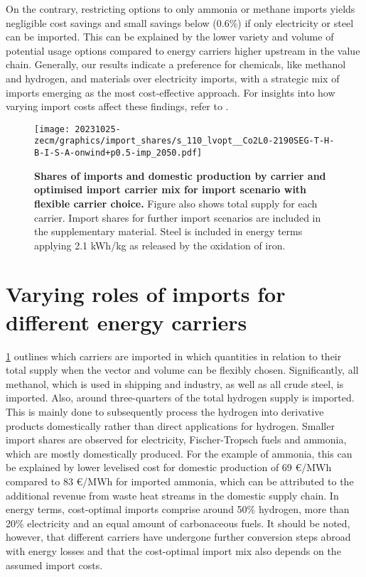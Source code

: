On the contrary, restricting options to only ammonia or methane imports yields
negligible cost savings and small savings below  (0.6\%) if only
electricity or steel can be imported. This can be explained by the lower variety
and volume of potential usage options compared to energy carriers higher
upstream in the value chain. Generally, our results indicate a preference for
chemicals, like methanol and hydrogen, and materials over electricity imports,
with a strategic mix of imports emerging as the most cost-effective approach.
For insights into how varying import costs affect these findings, refer to
. 

\begin{figure}[!htb]
    \texttt{[image: 20231025-zecm/graphics/import\_shares/s\_110\_lvopt\_\_Co2L0-2190SEG-T-H-B-I-S-A-onwind+p0.5-imp\_2050.pdf]}
    \caption{\textbf{Shares of imports and domestic production by carrier and optimised import carrier mix for import scenario with flexible carrier choice.} 
        Figure also shows total supply for each carrier.
        Import shares for further import scenarios are included in the supplementary material.
        Steel is included in energy terms applying 2.1 kWh/kg as released by the oxidation of iron.
    }
    \label{fig:import-shares}
\end{figure}

\section*{Varying roles of imports for different energy carriers}

\cref{fig:import-shares} outlines which carriers are imported in which
quantities in relation to their total supply when the vector and volume can be
flexibly chosen. Significantly, all methanol, which is used in shipping and
industry, as well as all crude steel, is imported. Also, around three-quarters
of the total hydrogen supply is imported. This is mainly done to subsequently
process the hydrogen into derivative products domestically rather than direct
applications for hydrogen. Smaller import shares are observed for electricity,
Fischer-Tropsch fuels and ammonia, which are mostly domestically produced. For
the example of ammonia, this can be explained by lower levelised cost for
domestic production of 69 \euro{}/MWh compared to 83 \euro{}/MWh for imported
ammonia, which can be attributed to the additional revenue from waste heat
streams in the domestic supply chain. In energy terms, cost-optimal imports
comprise around 50\% hydrogen, more than 20\% electricity and an equal amount of
carbonaceous fuels. It should be noted, however, that different carriers have
undergone further conversion steps abroad with energy losses and that the
cost-optimal import mix also depends on the assumed import costs.


